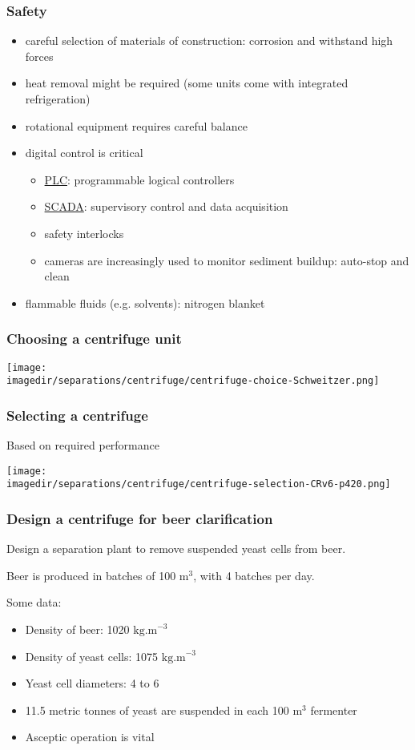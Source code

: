 \begin{frame}\frametitle{Safety}
	\begin{itemize}
		\item	careful selection of materials of construction: corrosion and withstand high forces
		\item	heat removal might be required (some units come with integrated refrigeration)
		\item	rotational equipment requires careful balance
		\item	digital control is critical
		\begin{itemize}
			\item	\href{http://en.wikipedia.org/wiki/Programmable_logic_controller}{PLC}: programmable logical controllers
			\item	\href{http://en.wikipedia.org/wiki/SCADA}{SCADA}: supervisory control and data acquisition
			\item	safety interlocks
			\item	cameras are increasingly used to monitor sediment buildup: auto-stop and clean
		\end{itemize}
		\item	flammable fluids (e.g. solvents): nitrogen blanket
	\end{itemize}
\end{frame}

\begin{frame}\frametitle{Choosing a centrifuge unit}
	\begin{center}
		\texttt{[image: \\imagedir/separations/centrifuge/centrifuge-choice-Schweitzer.png]}
	\end{center}
\end{frame}

\begin{frame}\frametitle{Selecting a centrifuge}
	Based on required performance
	\begin{center}
		\texttt{[image: \\imagedir/separations/centrifuge/centrifuge-selection-CRv6-p420.png]}
	\end{center}
\end{frame}

\begin{frame}\frametitle{Design a centrifuge for beer clarification}
	Design a separation plant to remove suspended yeast cells from beer.

	\vspace{12pt}
	Beer is produced in batches of 100 $\text{m}^3$, with 4 batches per day.

	\vspace{12pt}
	Some data:
	\begin{itemize}
		\item	Density of beer: 1020 $\text{kg.m}^{-3}$
		\item	Density of yeast cells: 1075 $\text{kg.m}^{-3}$
		\item	Yeast cell diameters: 4 to 6 \micron
		\item	11.5 metric tonnes of yeast are suspended in each 100 $\text{m}^3$ fermenter
		\item	Asceptic operation is vital
	\end{itemize}
\end{frame}

